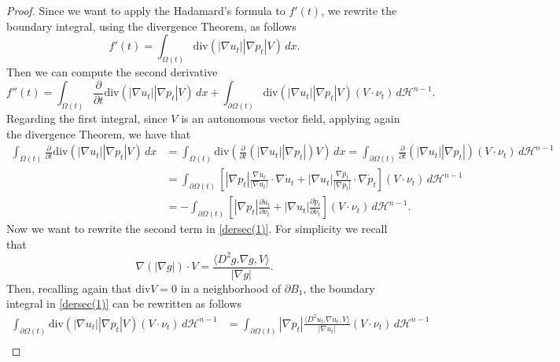 \documentclass[oneside,a4paper,11pt,notitlepage]{article}
\newcommand{\abs}[1]{{\left|#1\right|}}
\theoremstyle{definition}
\theoremstyle{plain}
\theoremstyle{definition}
\begin{document}
\begin{proof}
  Since we want to apply the Hadamard's formula to $f'(t)$, we rewrite the boundary integral, using the divergence Theorem, as follows
\begin{equation*}
    f'(t)=\int_{\Omega(t)}\mathrm{div}(\abs{\nabla u_t}\abs{\nabla p_t}V)\,dx.
\end{equation*}
Then we can compute the second derivative
\begin{equation}\label{dersec(1)}
    f''(t)=\int_{\Omega(t)}\frac{\partial}{\partial t}\mathrm{div}(\abs{\nabla u_t}\abs{\nabla p_t}V)\,dx+\int_{\partial\Omega(t)}\mathrm{div}(\abs{\nabla u_t}\abs{\nabla p_t}V)(V\cdot\nu_t)\,d\mathcal{H}^{n-1}.
\end{equation}
Regarding the first integral, since $V$ is an autonomous vector field, applying again the divergence Theorem, we have that
\begin{equation}\label{parte1}
    \begin{split}
        \int_{\Omega(t)}\frac{\partial}{\partial t}\mathrm{div}(\abs{\nabla u_t}\abs{\nabla p_t}V)\,dx&=\int_{\Omega(t)}\mathrm{div}\left(\frac{\partial}{\partial t}(\abs{\nabla u_t}\abs{\nabla p_t})V\right)\,dx=\int_{\partial\Omega(t)}\frac{\partial}{\partial t}(\abs{\nabla u_t}\abs{\nabla p_t})(V\cdot\nu_t)\,d\mathcal{H}^{n-1}\\
        &=\int_{\partial\Omega(t)}\left[\abs{\nabla p_t}\frac{\nabla u_t}{\abs{\nabla u_t}}\cdot\nabla \dot{u}_t+\abs{\nabla u_t}\frac{\nabla p_t}{\abs{\nabla p_t}}\cdot\nabla \dot{p}_t \right](V\cdot\nu_t)\,d\mathcal{H}^{n-1}\\
        &=-\int_{\partial\Omega(t)}\left[\abs{\nabla p_t}\frac{\partial\dot{u}_t}{\partial\nu_t}+\abs{\nabla u_t}\frac{\partial\dot{p}_t}{\partial\nu_t} \right](V\cdot\nu_t)\,d\mathcal{H}^{n-1}.
    \end{split}
\end{equation}
Now we want to rewrite the second term in \eqref{dersec(1)}. For simplicity we recall that
\begin{equation*}
    \nabla(\abs{\nabla g})\cdot V=\frac{\langle D^2g.\nabla g, V\rangle}{\abs{\nabla g}}.
\end{equation*}
Then, recalling again that $\mathrm{div}V=0$ in a neighborhood of $\partial B_1$, the boundary integral in \eqref{dersec(1)} can be rewritten as follows
\begin{equation}\label{parte2}
    \begin{split}
        \int_{\partial\Omega(t)}\mathrm{div}(\abs{\nabla u_t}\abs{\nabla p_t}V)(V\cdot\nu_t)\,d\mathcal{H}^{n-1}&=\int_{\partial\Omega(t)}\abs{\nabla p_t}\frac{\langle D^2u_t.\nabla u_t, V\rangle}{\abs{\nabla u_t}}(V\cdot\nu_t)\,d\mathcal{H}^{n-1}\\

\end{split}
\end{equation}
\end{proof}
\end{document}
